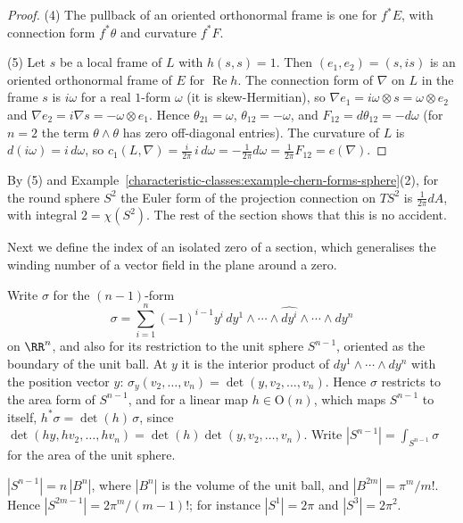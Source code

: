 \begin{proof}
(4) The pullback of an oriented orthonormal frame is one for $f^*E$, with connection form $f^*\theta$ and curvature $f^*F$.

(5) Let $s$ be a local frame of $L$ with $h(s, s) = 1$. Then $(e_1, e_2) = (s, is)$ is an oriented orthonormal frame of $E$ for $\operatorname{Re}h$. The connection form of $\nabla$ on $L$ in
the frame $s$ is $i\omega$ for a real $1$-form $\omega$ (it is skew-Hermitian), so $\nabla e_1 = i\omega \otimes s = \omega \otimes e_2$ and $\nabla e_2 = i\nabla s = -\omega \otimes e_1$. Hence
$\theta_{21} = \omega$, $\theta_{12} = -\omega$, and $F_{12} = d\theta_{12} = -d\omega$ (for $n = 2$ the term $\theta \wedge \theta$ has zero off-diagonal entries). The curvature of $L$ is
$d(i\omega) = i\,d\omega$, so $c_1(L, \nabla) = \frac{i}{2\pi}\,i\,d\omega = -\frac{1}{2\pi}d\omega = \frac{1}{2\pi}F_{12} = e(\nabla)$.
\end{proof}

By (5) and Example~\ref{characteristic-classes:example-chern-forms-sphere}(2), for the round sphere $S^2$ the Euler form of the projection connection on $TS^2$ is $\frac{1}{2\pi}dA$, with
integral $2 = \chi(S^2)$. The rest of the section shows that this is no accident.

Next we define the index of an isolated zero of a section, which generalises the winding number of a vector field in the plane around a zero.

Write $\sigma$ for the $(n-1)$-form
\[
\sigma = \sum_{i=1}^n(-1)^{i-1}y^i\,dy^1 \wedge \cdots \wedge \widehat{dy^i} \wedge \cdots \wedge dy^n
\]
on $\RR^n$, and also for its restriction to the unit sphere $S^{n-1}$, oriented as the boundary of the unit ball. At $y$ it is the interior product of $dy^1 \wedge \cdots \wedge dy^n$ with
the position vector $y$: $\sigma_y(v_2, \ldots, v_n) = \det(y, v_2, \ldots, v_n)$. Hence $\sigma$ restricts to the area form of $S^{n-1}$, and for a linear map $h \in \mathrm{O}(n)$, which maps
$S^{n-1}$ to itself, $h^*\sigma = \det(h)\,\sigma$, since $\det(hy, hv_2, \ldots, hv_n) = \det(h)\det(y, v_2, \ldots, v_n)$. Write $|S^{n-1}| = \int_{S^{n-1}}\sigma$ for the area of the unit sphere.

\begin{lemma}\label{characteristic-classes:lemma-sphere-area}
$|S^{n-1}| = n\,|B^n|$, where $|B^n|$ is the volume of the unit ball, and $|B^{2m}| = \pi^m/m!$. Hence $|S^{2m-1}| = 2\pi^m/(m-1)!$; for instance $|S^1| = 2\pi$ and $|S^3| = 2\pi^2$.
\end{lemma}

